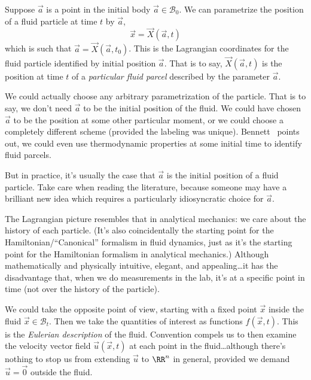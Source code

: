 \begin{node}\label{fluids:describing-0002}%
Suppose $\vec{a}$ is a point in the initial body $\vec{a}\in\mathcal{B}_{0}$.
We can parametrize the position of a fluid particle at time $t$ by $\vec{a}$,
\begin{equation*}
\vec{x}=\vec{X}(\vec{a},t)
\end{equation*}
which is such that $\vec{a}=\vec{X}(\vec{a},t_{0})$. This is the
Lagrangian coordinates for the fluid particle identified by initial
position $\vec{a}$. That is to say, $\vec{X}(\vec{a},t)$ is the position
at time $t$ of a \emph{particular fluid parcel} described by the
parameter $\vec{a}$.

\begin{node}[Parametrization]\label{fluids:describing-0003}%
We could actually choose any arbitrary parametrization of the
particle. That is to say, we don't need $\vec{a}$ to be the initial
position of the fluid. We could have chosen $\vec{a}$ to be the position
at some other particular moment, or we could choose a completely
different scheme (provided the labeling was
unique). Bennett~\cite[pg.5]{bennett2006lagrangian} points out, we could
even use thermodynamic properties at some initial time to identify fluid
parcels.

But in practice, it's usually the case that $\vec{a}$ is the initial
position of a fluid particle. Take care when reading the literature,
because someone may have a brilliant new idea which requires a
particularly idiosyncratic choice for $\vec{a}$.
\end{node} %

\begin{node}\label{fluids:describing-0004}%
The Lagrangian picture resembles that in analytical mechanics: we care
about the history of each particle. (It's also coincidentally the
starting point for the Hamiltonian/``Canonical'' formalism in fluid
dynamics, just as it's the starting point for the Hamiltonian formalism
in analytical mechanics.) Although mathematically and physically
intuitive, elegant, and appealing\dots it has the disadvantage that, when
we do measurements in the lab, it's at a specific point in time (not
over the history of the particle). 
\end{node} %
\end{node} %

\begin{node}\label{fluids:describing-0005}%
We could take the opposite point of view, starting with a fixed point
$\vec{x}$ inside the fluid $\vec{x}\in\mathcal{B}_{t}$. Then we take the
quantities of interest as functions $f(\vec{x},t)$. This is the
\emph{Eulerian description} of the fluid. Convention compels us to then
examine the velocity vector field $\vec{u}(\vec{x},t)$ at each point in
the fluid\dots although there's nothing to stop us from extending
$\vec{u}$ to $\RR^{n}$ in general, provided we demand $\vec{u}=\vec{0}$
outside the fluid.
\end{node} %

